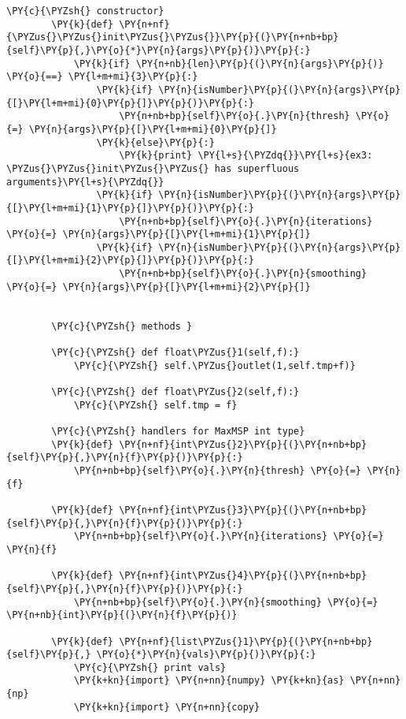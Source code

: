 \begin{Verbatim}[commandchars=\\\{\}]
       	\PY{c}{\PYZsh{} constructor}
       	\PY{k}{def} \PY{n+nf}{\PYZus{}\PYZus{}init\PYZus{}\PYZus{}}\PY{p}{(}\PY{n+nb+bp}{self}\PY{p}{,}\PY{o}{*}\PY{n}{args}\PY{p}{)}\PY{p}{:}
       		\PY{k}{if} \PY{n+nb}{len}\PY{p}{(}\PY{n}{args}\PY{p}{)} \PY{o}{==} \PY{l+m+mi}{3}\PY{p}{:} 
       			\PY{k}{if} \PY{n}{isNumber}\PY{p}{(}\PY{n}{args}\PY{p}{[}\PY{l+m+mi}{0}\PY{p}{]}\PY{p}{)}\PY{p}{:}
       				\PY{n+nb+bp}{self}\PY{o}{.}\PY{n}{thresh} \PY{o}{=} \PY{n}{args}\PY{p}{[}\PY{l+m+mi}{0}\PY{p}{]}
       			\PY{k}{else}\PY{p}{:}
       				\PY{k}{print} \PY{l+s}{\PYZdq{}}\PY{l+s}{ex3: \PYZus{}\PYZus{}init\PYZus{}\PYZus{} has superfluous arguments}\PY{l+s}{\PYZdq{}}
       			\PY{k}{if} \PY{n}{isNumber}\PY{p}{(}\PY{n}{args}\PY{p}{[}\PY{l+m+mi}{1}\PY{p}{]}\PY{p}{)}\PY{p}{:}
       				\PY{n+nb+bp}{self}\PY{o}{.}\PY{n}{iterations} \PY{o}{=} \PY{n}{args}\PY{p}{[}\PY{l+m+mi}{1}\PY{p}{]}
       			\PY{k}{if} \PY{n}{isNumber}\PY{p}{(}\PY{n}{args}\PY{p}{[}\PY{l+m+mi}{2}\PY{p}{]}\PY{p}{)}\PY{p}{:}
       				\PY{n+nb+bp}{self}\PY{o}{.}\PY{n}{smoothing} \PY{o}{=} \PY{n}{args}\PY{p}{[}\PY{l+m+mi}{2}\PY{p}{]}
       
       
       	\PY{c}{\PYZsh{} methods }
       
       	\PY{c}{\PYZsh{} def float\PYZus{}1(self,f):}
       		\PY{c}{\PYZsh{} self.\PYZus{}outlet(1,self.tmp+f)}
       
       	\PY{c}{\PYZsh{} def float\PYZus{}2(self,f):}
       		\PY{c}{\PYZsh{} self.tmp = f}
       
       	\PY{c}{\PYZsh{} handlers for MaxMSP int type}
       	\PY{k}{def} \PY{n+nf}{int\PYZus{}2}\PY{p}{(}\PY{n+nb+bp}{self}\PY{p}{,}\PY{n}{f}\PY{p}{)}\PY{p}{:}  
       		\PY{n+nb+bp}{self}\PY{o}{.}\PY{n}{thresh} \PY{o}{=} \PY{n}{f}
       
       	\PY{k}{def} \PY{n+nf}{int\PYZus{}3}\PY{p}{(}\PY{n+nb+bp}{self}\PY{p}{,}\PY{n}{f}\PY{p}{)}\PY{p}{:}  
       		\PY{n+nb+bp}{self}\PY{o}{.}\PY{n}{iterations} \PY{o}{=} \PY{n}{f}
       
       	\PY{k}{def} \PY{n+nf}{int\PYZus{}4}\PY{p}{(}\PY{n+nb+bp}{self}\PY{p}{,}\PY{n}{f}\PY{p}{)}\PY{p}{:}  
       		\PY{n+nb+bp}{self}\PY{o}{.}\PY{n}{smoothing} \PY{o}{=} \PY{n+nb}{int}\PY{p}{(}\PY{n}{f}\PY{p}{)}
       
       	\PY{k}{def} \PY{n+nf}{list\PYZus{}1}\PY{p}{(}\PY{n+nb+bp}{self}\PY{p}{,} \PY{o}{*}\PY{n}{vals}\PY{p}{)}\PY{p}{:}
       		\PY{c}{\PYZsh{} print vals}
       		\PY{k+kn}{import} \PY{n+nn}{numpy} \PY{k+kn}{as} \PY{n+nn}{np}
       		\PY{k+kn}{import} \PY{n+nn}{copy}
       

\end{Verbatim}
